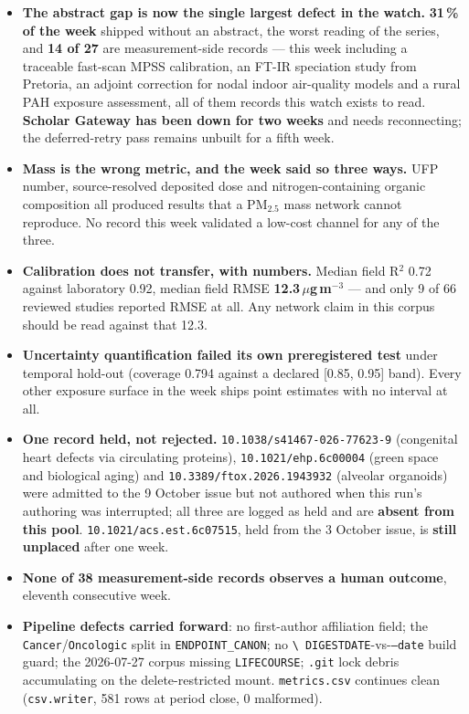 \documentclass[10pt]{article}
\begin{document}
\footnotesize
\begin{itemize}
\item \textbf{The abstract gap is now the single largest defect in the watch.} \textbf{31\,\% of the
week} shipped without an abstract, the worst reading of the series, and \textbf{14 of 27} are
measurement-side records --- this week including a traceable fast-scan MPSS calibration, an FT-IR
speciation study from Pretoria, an adjoint correction for nodal indoor air-quality models and a rural
PAH exposure assessment, all of them records this watch exists to read. \textbf{Scholar Gateway has been
down for two weeks} and needs reconnecting; the deferred-retry pass remains unbuilt for a fifth week.

\item \textbf{Mass is the wrong metric, and the week said so three ways.} UFP number, source-resolved
deposited dose and nitrogen-containing organic composition all produced results that a PM$_{2.5}$ mass
network cannot reproduce. No record this week validated a low-cost channel for any of the three.

\item \textbf{Calibration does not transfer, with numbers.} Median field R$^2$ 0.72 against laboratory
0.92, median field RMSE \textbf{12.3\,$\mu$g\,m$^{-3}$} --- and only 9 of 66 reviewed studies reported
RMSE at all. Any network claim in this corpus should be read against that 12.3.

\item \textbf{Uncertainty quantification failed its own preregistered test} under temporal hold-out
(coverage 0.794 against a declared [0.85, 0.95] band). Every other exposure surface in the week ships
point estimates with no interval at all.

\item \textbf{One record held, not rejected.} \texttt{10.1038/s41467-026-77623-9} (congenital heart
defects via circulating proteins), \texttt{10.1021/ehp.6c00004} (green space and biological aging) and
\texttt{10.3389/ftox.2026.1943932} (alveolar organoids) were admitted to the 9 October issue but not
authored when this run's authoring was interrupted; all three are logged as held and are \textbf{absent
from this pool}. \texttt{10.1021/acs.est.6c07515}, held from the 3 October issue, is \textbf{still
unplaced} after one week.

\item \textbf{None of 38 measurement-side records observes a human outcome}, eleventh consecutive week.

\item \textbf{Pipeline defects carried forward}: no first-author affiliation field; the
\texttt{Cancer}/\texttt{Oncologic} split in \texttt{ENDPOINT\_CANON}; no \texttt{\textbackslash
DIGESTDATE}-vs-\texttt{--date} build guard; the 2026-07-27 corpus missing \texttt{LIFECOURSE};
\texttt{.git} lock debris accumulating on the delete-restricted mount. \texttt{metrics.csv} continues
clean (\texttt{csv.writer}, 581 rows at period close, 0 malformed).
\end{itemize}
\end{document}
